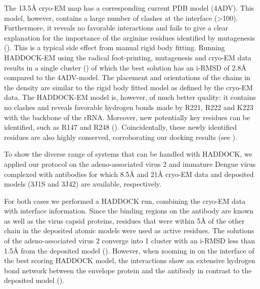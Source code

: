The 13.5Å cryo-EM map has a corresponding current PDB model (4ADV).
This model, however, contains a large number of clashes at the interface
(>100).  Furthermore, it reveals no favorable interactions and fails to give a
clear explanation for the importance of the arginine residues identified by
mutagenesis ().  This is a typical side effect
from manual rigid body fitting.  Running HADDOCK-EM using the radical
foot-printing, mutagenesis and cryo-EM data results in a single cluster
() of which the best solution has an i-RMSD of
2.8Å compared to the 4ADV-model.  The placement and orientations of
the chains in the density are similar to the rigid body fitted model as defined
by the cryo-EM data. The HADDOCK-EM model is, however, of much better quality:
it contains no clashes and reveals favorable hydrogen bonds made by R221, R222
and K223 with the backbone of the rRNA.  Moreover, new potentially key residues
can be identified, such as R147 and R248 ().
Coincidentally, these newly identified residues are also highly conserved,
corroborating our docking results (see ).



{}

To show the diverse range of systems that can be handled with HADDOCK, we
applied our protocol on the adeno-associated virus 2 and immature Dengue virus
complexed with antibodies for which 8.5Å and 21Å cryo-EM data
and deposited models (3J1S and 3J42) are available, respectively.

For both cases we performed a HADDOCK run, combining the cryo-EM data with
interface information. Since the binding regions on the antibody are known as
well as the virus capsid proteins, residues that were within 5Å of the
other chain in the deposited atomic models were used as active residues.  The
solutions of the adeno-associated virus 2 converge into 1 cluster with an
i-RMSD less than 1.5Å from the deposited model
().  However, when zooming in on the interface
of the best scoring HADDOCK model, the interactions show an extensive hydrogen
bond network between the envelope protein and the antibody in contrast to the
deposited model (). 

{}

